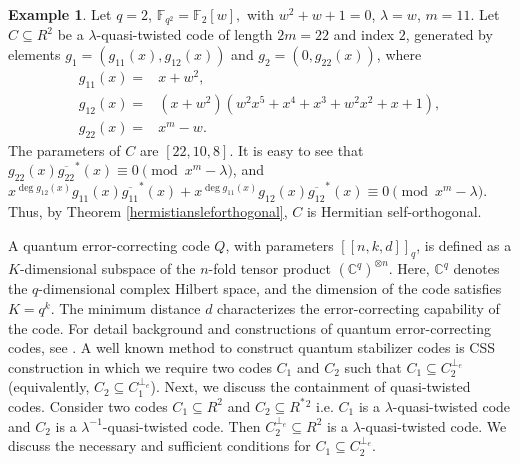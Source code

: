 \documentclass[12 pt]{extarticle}
\numberwithin{equation}{section}
\theoremstyle{definition}
\newtheorem{example}{Example}[section]
\begin{document}
\begin{example}
Let $q=2$, $\mathbb{F}_{q^2}=\mathbb{F}_2[w],$ with $w^2+w+1=0$, $ \lambda=w$,  $m=11$.  
Let $C\subseteq R^2$ be a $\lambda$-quasi-twisted code of length $2m=22$ and index $2$, generated by elements $g_1=(g_{11}(x),g_{12}(x))$ and $g_2=(0,g_{22}(x))$, where
\begin{equation*}
    \begin{split}
       g_{11}(x)=&x+w^2,\\
       g_{12}(x)=&(x+w^2)(w^2x^5 + x^4 + x^3 + w^2x^2 + x + 1), \\
       g_{22}(x)=&x^m-w. 
    \end{split}
\end{equation*}
The parameters of $C$ are $[22,10,8]$. It is easy to see that $g_{22}(x)\overline{g_{22}}^*(x)\equiv 0\pmod{x^m-\lambda}$,
   and
$x^{\deg g_{12}(x)} g_{11}(x)\overline{g_{11}}^*(x)+x^{\deg g_{11}(x)}g_{12}(x)\overline{g_{12}}^*(x)\equiv 0\pmod{x^m-\lambda}$.
Thus, by Theorem \ref{hermistiansleforthogonal}, $C$ is Hermitian self-orthogonal. 
\end{example}


A quantum error-correcting code $Q$, with parameters $[[n,k,d]]_q$, is defined as a $K$-dimensional subspace of the $n$-fold tensor product $(\mathbb{C}^q)^{\otimes n}$. Here, $\mathbb{C}^q$ denotes the $q$-dimensional complex Hilbert space, and the dimension of the code satisfies $K = q^k$. The minimum distance $d$ characterizes the error-correcting capability of the code.
For detail background and constructions of quantum error-correcting codes, see \cite{ezerman2024}.
A well known method to construct quantum stabilizer codes is CSS construction in which we require two codes $C_1$ and $C_2$ such that $C_1\subseteq C_2^{\perp_e}$ (equivalently, $C_2\subseteq C_1^{\perp_e}$). Next, we discuss the containment of quasi-twisted codes. Consider two codes $C_1\subseteq R^2$ and $C_2\subseteq R^*{^2}$ i.e. $C_1$ is a $\lambda$-quasi-twisted code and $C_2$ is a $\lambda^{-1}$-quasi-twisted code. Then $C_2^{\perp_e}\subseteq R^2$ is a $\lambda$-quasi-twisted code. We discuss the necessary and sufficient conditions for $C_1\subseteq C_2^{\perp_e}$. 
\end{document}

